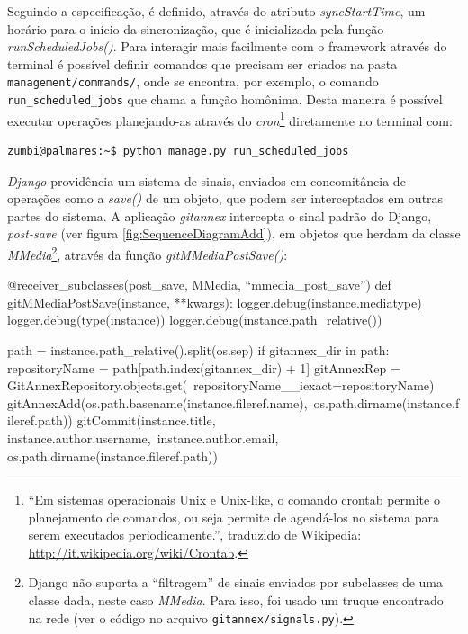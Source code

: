 Seguindo a especificação, é definido, através do atributo
\emph{syncStartTime}, um horário para o início da sincronização, que é
inicializada pela função \emph{runScheduledJobs()}. Para interagir
mais facilmente com o framework através do terminal é possível definir
comandos que precisam ser criados na pasta
\verb|management/commands/|, onde se encontra, por exemplo, o comando
\verb|run_scheduled_jobs| que chama a função homônima. Desta maneira
é possível executar operações planejando-as através do
\emph{cron}\footnote{``Em sistemas operacionais Unix e Unix-like, o
  comando crontab permite o planejamento de comandos, ou seja permite
  de agendá-los no sistema para serem executados periodicamente.'',
  traduzido de Wikipedia:
  \url{http://it.wikipedia.org/wiki/Crontab}.} diretamente no
terminal com:
\begin{verbatim}
zumbi@palmares:~$ python manage.py run_scheduled_jobs
\end{verbatim}

\emph{Django} providência um sistema de sinais, enviados em
concomitância de operações como a \emph{save()} de um objeto, que
podem ser interceptados em outras partes do sistema. A aplicação
\emph{gitannex} intercepta o sinal padrão do Django, \emph{post-save}
(ver figura \ref{fig:SequenceDiagramAdd}), em objetos que herdam da
classe \emph{MMedia}\footnote{Django não suporta a ``filtragem'' de
  sinais enviados por subclasses de uma classe dada, neste caso
  \emph{MMedia}. Para isso, foi usado um truque encontrado na rede
  (ver o código no arquivo \texttt{gitannex/signals.py}).}, através da
função \emph{gitMMediaPostSave()}:

\begin{code}
@receiver_subclasses(post_save, MMedia, ``mmedia_post_save'')
def gitMMediaPostSave(instance, **kwargs):
    logger.debug(instance.mediatype)
    logger.debug(type(instance))
    logger.debug(instance.path_relative())

    path = instance.path_relative().split(os.sep)
    if gitannex_dir in path:
        repositoryName = path[path.index(gitannex_dir) + 1]
        gitAnnexRep = GitAnnexRepository.objects.get(\
                      repositoryName__iexact=repositoryName)
        gitAnnexAdd(os.path.basename(instance.fileref.name),\
                    os.path.dirname(instance.fileref.path))
        gitCommit(instance.title, instance.author.username,\
                  instance.author.email, os.path.dirname(instance.fileref.path))
\end{code}
